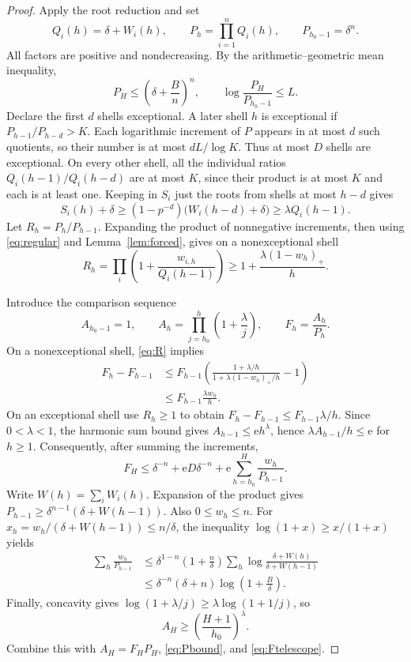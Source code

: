 \documentclass[11pt]{article}
\theoremstyle{remark}\newtheorem{remark}[theorem]{Remark}
\begin{document}
\begin{proof}
Apply the root reduction and set
\[
 Q_i(h)=\delta+W_i(h),\qquad P_h=\prod_{i=1}^nQ_i(h),\qquad
 P_{h_0-1}=\delta^n.
\]
All factors are positive and nondecreasing. By the arithmetic--geometric mean inequality,
\begin{equation}\label{eq:Pbound}
 P_H\le\left(\delta+\frac Bn\right)^n,
 \qquad \log\frac{P_H}{P_{h_0-1}}\le L.
\end{equation}
Declare the first $d$ shells exceptional. A later shell $h$ is exceptional if
$P_{h-1}/P_{h-d}>K$. Each logarithmic increment of $P$ appears in at most $d$
such quotients, so their number is at most $dL/\log K$. Thus at most $D$ shells
are exceptional. On every other shell, all the individual ratios
$Q_i(h-1)/Q_i(h-d)$ are at most $K$, since their product is at most $K$ and
each is at least one. Keeping in $S_i$ just the roots from shells at most $h-d$ gives
\begin{equation}\label{eq:regular}
 S_i(h)+\delta
 \ge (1-p^{-d})\bigl(W_i(h-d)+\delta\bigr)
 \ge\lambda Q_i(h-1).
\end{equation}
Let $R_h=P_h/P_{h-1}$. Expanding the product of nonnegative increments,
then using \eqref{eq:regular} and Lemma~\ref{lem:forced}, gives on a nonexceptional shell
\begin{equation}\label{eq:R}
 R_h=\prod_i\left(1+\frac{w_{i,h}}{Q_i(h-1)}\right)
 \ge1+\frac{\lambda(1-w_h)_+}{h}.
\end{equation}

Introduce the comparison sequence
\[
 A_{h_0-1}=1,\qquad
 A_h=\prod_{j=h_0}^{h}\left(1+\frac\lambda j\right),\qquad F_h=\frac{A_h}{P_h}.
\]
On a nonexceptional shell, \eqref{eq:R} implies
\begin{align*}
 F_h-F_{h-1}
 &\le F_{h-1}\left(
 \frac{1+\lambda/h}{1+\lambda(1-w_h)_+/h}-1\right)\\
 &\le F_{h-1}\frac{\lambda w_h}{h}.
\end{align*}
On an exceptional shell use $R_h\ge1$ to obtain
$F_h-F_{h-1}\le F_{h-1}\lambda/h$.
Since $0<\lambda<1$, the harmonic sum bound gives
$A_{h-1}\le\mathrm e h^\lambda$, hence
$\lambda A_{h-1}/h\le\mathrm e$ for $h\ge1$.
Consequently, after summing the increments,
\begin{equation}\label{eq:Ftelescope}
 F_H\le\delta^{-n}+\mathrm e D\delta^{-n}
       +\mathrm e\sum_{h=h_0}^H\frac{w_h}{P_{h-1}}.
\end{equation}
Write $W(h)=\sum_iW_i(h)$. Expansion of the product gives
$P_{h-1}\ge\delta^{n-1}(\delta+W(h-1))$.
Also $0\le w_h\le n$. For
$x_h=w_h/(\delta+W(h-1))\le n/\delta$, the inequality
$\log(1+x)\ge x/(1+x)$ yields
\begin{align*}
 \sum_h\frac{w_h}{P_{h-1}}
 &\le\delta^{1-n}\left(1+\frac n\delta\right)
        \sum_h\log\frac{\delta+W(h)}{\delta+W(h-1)}\\
 &\le\delta^{-n}(\delta+n)\log\left(1+\frac B\delta\right).
\end{align*}
Finally, concavity gives
$\log(1+\lambda/j)\ge\lambda\log(1+1/j)$, so
\[
 A_H\ge\left(\frac{H+1}{h_0}\right)^\lambda.
\]
Combine this with $A_H=F_HP_H$, \eqref{eq:Pbound}, and \eqref{eq:Ftelescope}.
\end{proof}
\end{document}
